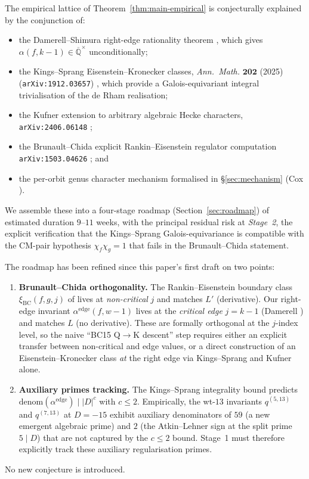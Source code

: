 \documentclass[11pt,a4paper]{amsart}
\theoremstyle{plain}
\theoremstyle{definition}
\newcommand{\Q}{\mathbb{Q}}
\newcommand{\qstr}[2]{q^{(#1,#2)}}
\begin{document}
The empirical lattice of Theorem~\ref{thm:main-empirical} is conjecturally
explained by the conjunction of:
\begin{itemize}
\item the Damerell--Shimura right-edge rationality theorem
\cite{Damerell1971a, Shimura1976}, which gives
$\alpha(f, k-1)\in\overline{\Q}^{\times}$ unconditionally;
\item the Kings--Sprang Eisenstein--Kronecker classes,
\emph{Ann.~Math.} $\mathbf{202}$ (2025) (\texttt{arXiv:1912.03657})
\cite{KingsSprang2025}, which provide a Galois-equivariant integral
trivialisation of the de Rham realisation;
\item the Kufner extension to arbitrary algebraic Hecke characters,
\texttt{arXiv:2406.06148} \cite{Kufner2024};
\item the Brunault--Chida explicit Rankin--Eisenstein regulator computation
\texttt{arXiv:1503.04626} \cite{BrunaultChida2015}; and
\item the per-orbit genus character mechanism formalised in
\S\ref{sec:mechanism} (Cox \cite[Thm.~6.1]{Cox1989}).
\end{itemize}
We assemble these into a four-stage roadmap (Section~\ref{sec:roadmap})
of estimated duration $9$--$11$ weeks, with the principal residual
risk at \emph{Stage~2}, the explicit verification that the Kings--Sprang
Galois-equivariance is compatible with the CM-pair hypothesis
$\chi_f\chi_g = 1$ that fails in the Brunault--Chida statement.

The roadmap has been refined since this paper's first draft on two
points:
\begin{enumerate}
\item \textbf{Brunault--Chida orthogonality.} The Rankin--Eisenstein
boundary class $\xi_{\mathrm{BC}}(f, g, j)$ of \cite{BrunaultChida2015}
lives at \emph{non-critical} $j$ and matches $L'$ (derivative). Our
right-edge invariant $\alpha^{\mathrm{edge}}(f, w-1)$ lives at the
\emph{critical edge} $j = k-1$ (Damerell \cite{Damerell1971a}) and matches
$L$ (no derivative). These are formally orthogonal at the
$j$-index level, so the naive ``BC15 Q$\to$K descent'' step requires
either an explicit transfer between non-critical and edge values, or
a direct construction of an Eisenstein--Kronecker class \emph{at} the
right edge via Kings--Sprang and Kufner alone.
\item \textbf{Auxiliary primes tracking.} The Kings--Sprang integrality
bound \cite[Thm.~4.10]{KingsSprang2025} predicts $\mathrm{denom}(\alpha^{\mathrm{edge}})
\mid |D|^c$ with $c \le 2$. Empirically, the wt-$13$ invariants
$\qstr{5}{13}$ and $\qstr{7}{13}$ at $D = -15$ exhibit auxiliary
denominators of $59$ (a new emergent algebraic prime) and $2$ (the
Atkin--Lehner sign at the split prime $5 \mid D$) that are not captured
by the $c \le 2$ bound. Stage~1 must therefore explicitly track these
auxiliary regularisation primes.
\end{enumerate}
No new conjecture is introduced.
\end{document}
